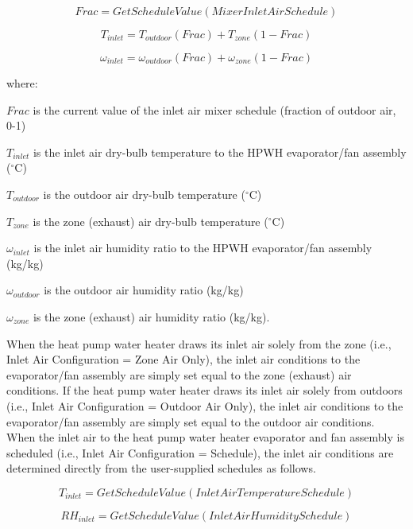 \begin{equation}
Frac = GetScheduleValue(MixerInletAirSchedule)
\end{equation}

\begin{equation}
{T_{inlet}} = {T_{outdoor}}\left( {Frac} \right) + {T_{zone}}\left( {1 - Frac} \right)
\end{equation}

\begin{equation}
{\omega_{inlet}} = {\omega_{outdoor}}\left( {Frac} \right) + {\omega_{zone}}\left( {1 - Frac} \right)
\end{equation}

where:

\(Frac\) is the current value of the inlet air mixer schedule (fraction of outdoor air, 0-1)

\({T_{inlet}}\) is the inlet air dry-bulb temperature to the HPWH evaporator/fan assembly (\(^{\circ}\)C)

\({T_{outdoor}}\) is the outdoor air dry-bulb temperature (\(^{\circ}\)C)

\({T_{zone}}\) is the zone (exhaust) air dry-bulb temperature (\(^{\circ}\)C)

\({\omega_{inlet}}\) is the inlet air humidity ratio to the HPWH evaporator/fan assembly (kg/kg)

\({\omega_{outdoor}}\) is the outdoor air humidity ratio (kg/kg)

\({\omega_{zone}}\) is the zone (exhaust) air humidity ratio (kg/kg).

When the heat pump water heater draws its inlet air solely from the zone (i.e., Inlet Air Configuration = Zone Air Only), the inlet air conditions to the evaporator/fan assembly are simply set equal to the zone (exhaust) air conditions. If the heat pump water heater draws its inlet air solely from outdoors (i.e., Inlet Air Configuration = Outdoor Air Only), the inlet air conditions to the evaporator/fan assembly are simply set equal to the outdoor air conditions. When the inlet air to the heat pump water heater evaporator and fan assembly is scheduled (i.e., Inlet Air Configuration = Schedule), the inlet air conditions are determined directly from the user-supplied schedules as follows.

\begin{equation}
{T_{inlet}} = GetScheduleValue(InletAirTemperatureSchedule)
\end{equation}

\begin{equation}
{RH_{inlet}} = GetScheduleValue(InletAirHumiditySchedule)
\end{equation}

